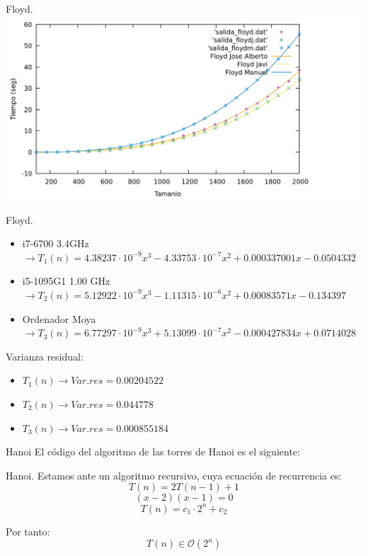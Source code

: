 \documentclass[10pt, xcolor=table]{beamer}
\begin{document}
\begin{frame}{Floyd.
}
\centering
\includegraphics[scale=0.15]{../../Images/floyd_combinados.png}
\end{frame}

\begin{frame}{Floyd.
}
\begin{itemize}
	\item i7-6700 3.4GHz \(\rightarrow T_1(n) = 4.38237 \cdot 10^{-9} x^3 - 4.33753 \cdot 10^{-7} x^2 + 0.000337001x - 0.0504332\)
	\item i5-1095G1 1.00 GHz \(\rightarrow T_2(n) = 5.12922 \cdot 10^{-9} x^3 - 1.11315 \cdot 10^{-6} x^2 + 0.00083571x - 0.134397\)
	\item Ordenador Moya \(\rightarrow T_3(n) = 6.77297 \cdot 10^{-9} x^3 + 5.13099 \cdot 10^{-7} x^2 - 0.000427834 x + 0.0714028\)
\end{itemize}

Varianza residual:
\begin{itemize}
	\item \(T_1 (n) \longrightarrow Var.res = 0.00204522\)
	\item \(T_2 (n) \longrightarrow Var.res = 0.044778\)
	\item \(T_3 (n) \longrightarrow Var.res = 0.000855184\)
\end{itemize}
\end{frame}

\begin{frame}{Hanoi}
El código del algoritmo de las torres de Hanoi es el siguiente:

\end{frame}

\begin{frame}[fragile]{Hanoi.
}
Estamos ante un algoritmo recursivo, cuya ecuación de recurrencia es:
\[
	T(n) = 2 T(n-1) +1
\]
\[
	(x-2)(x-1) = 0
\]
\[
	T(n) = c_1 \cdot 2^n + c_2
\]

Por tanto:
\[
	T(n) \in \mathcal{O}(2^n)
\]
\end{frame}
\end{document}
